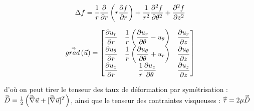 $$
\Delta f = \frac{1}{r} \frac {\partial } {\partial r} \left( r \frac {\partial f} {\partial r} \right) + \frac{1}{r^2}\frac {\partial ^2 f} {\partial \theta^2} + \frac {\partial ^2 f} {\partial z^2}
$$


$$
\displaystyle
\accentset{\Rightarrow}{grad} \left( \vec{u} \right)  =
\begin{bmatrix}
\displaystyle \frac{\partial u_r}{\partial r} & \displaystyle \frac{1}{r} \left( \frac{\partial u_r}{\partial \theta} - u_\theta \right) & \displaystyle \frac{\partial u_r}{\partial z} \\
\displaystyle \frac{\partial u_\theta}{\partial r} & \displaystyle \frac{1}{r} \left( \frac{\partial u_\theta}{\partial \theta} + u_r \right) & \displaystyle \frac{\partial u_\theta}{\partial z} \\
\displaystyle \frac{\partial u_z}{\partial r} & \displaystyle \frac{1}{r} \frac{\partial u_z}{\partial \theta} & \displaystyle \frac{\partial u_z}{\partial z}
\end{bmatrix}
$$

\noindent d'où on peut tirer le tenseur des taux de déformation par symétrisation : $\accentset{\Rightarrow}{D}=\frac{1}{2} \left( \accentset{\Rightarrow}{\nabla} \vec{ u} + [\accentset{\Rightarrow}{\nabla}\vec{  u}]^T \right)$, ainsi que le tenseur des contraintes visqueuses : $\accentset{\Rightarrow}{\tau} = 2 \mu \accentset{\Rightarrow}{D}$
%
%
%
%
%





